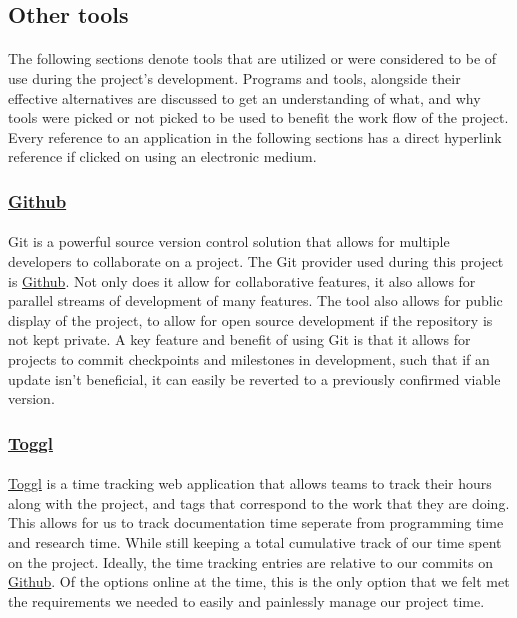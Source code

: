 \documentclass[12pt]{article}
\begin{document}
\subsection{Other tools}
\paragraph{}	The following sections denote tools that are utilized or were considered to be of use during the project's development. Programs and tools, alongside their effective alternatives are discussed to get an understanding of what, and why tools were picked or not picked to be used to benefit the work flow of the project. Every reference to an application in the following sections has a direct hyperlink reference if clicked on using an electronic medium.

\subsubsection{\href{https://Github.com}{Github}}
\paragraph{}	Git is a powerful source version control solution that allows for multiple developers to collaborate on  a project. The Git provider used during this project is \href{https://Github.com}{Github}. Not only does it allow for collaborative features, it also allows for parallel streams of development of many features. The tool also allows for public display of the project, to allow for open source development if the repository is not kept private. A key feature and benefit of using Git is that it allows for projects to commit checkpoints and milestones in development, such that if an update isn't beneficial, it can easily be reverted to a previously confirmed viable version.

\subsubsection{\href{https://toggl.com}{Toggl}}
\paragraph{}	\href{https://toggl.com}{Toggl} is a time tracking web application that allows teams to track their hours along with the project, and tags that correspond to the work that they are doing. This allows for us to track documentation time seperate from programming time and research time. While still keeping a total cumulative track of our time spent on the project. Ideally, the time tracking entries are relative to our commits on \href{https://Github.com}{Github}. Of the options online at the time, this is the only option that we felt met the requirements we needed to easily and painlessly manage our project time.
\end{document}
